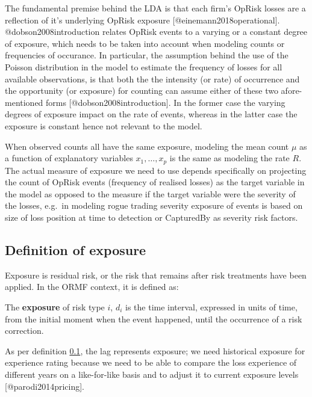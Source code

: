\documentclass[]{article}
\begin{document}
The fundamental premise behind the LDA is that each firm's OpRisk losses
are a reflection of it's underlying OpRisk exposure
{[}@einemann2018operational{]}. @dobson2008introduction relates OpRisk
events to a varying or a constant degree of exposure, which needs to be
taken into account when modeling counts or frequencies of occurance. In
particular, the assumption behind the use of the Poisson distribution in
the model to estimate the frequency of losses for all available
observations, is that both the the intensity (or rate) of occurrence and
the opportunity (or exposure) for counting can assume either of these
two afore-mentioned forms {[}@dobson2008introduction{]}. In the former
case the varying degrees of exposure impact on the rate of events,
whereas in the latter case the exposure is constant hence not relevant
to the model.\medskip

When observed counts all have the same exposure, modeling the mean count
\(\mu\) as a function of explanatory variables \(x_{1},\ldots,x_{p}\) is
the same as modeling the rate \(R\). The actual measure of exposure we
need to use depends specifically on projecting the count of OpRisk
events (frequency of realised losses) as the target variable in the
model as opposed to the measure if the target variable were the severity
of the losses, e.g.~in modeling rogue trading severity exposure of
events is based on size of loss position at time to detection or
CapturedBy as severity risk factors.

\subsection{Definition of exposure}
\label{ssec:Definition of exposure}

Exposure is residual risk, or the risk that remains after risk
treatments have been applied. In the ORMF context, it is defined as:

\begin{definition}
The  \textbf{exposure} of risk type $i$, $d_{i}$ is the time interval, expressed in units of time, from the initial moment when the event happened, until the occurrence of a risk correction.
\end{definition}

As per definition \ref{ssec:Definition of exposure}, the lag represents
exposure; we need historical exposure for experience rating because we
need to be able to compare the loss experience of different years on a
like-for-like basis and to adjust it to current exposure levels
{[}@parodi2014pricing{]}.
\end{document}
